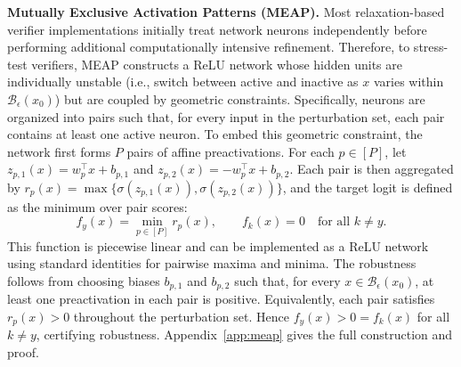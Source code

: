 \documentclass{article}
\theoremstyle{definition}
\begin{document}
\textbf{Mutually Exclusive Activation Patterns (MEAP).} 
Most relaxation-based verifier implementations initially treat network neurons independently before performing additional computationally intensive refinement. 
Therefore, to stress-test verifiers, MEAP constructs a ReLU network whose hidden units are individually unstable (i.e., switch between active and inactive as $x$ varies within $\mathcal{B}_\epsilon(x_0)$) but are coupled by %
geometric constraints. Specifically, neurons are organized into pairs such that, for every input in the perturbation set, each pair contains at least one active neuron. 
To embed this geometric constraint, the network first forms $P$ pairs of affine preactivations. 
For each $p\in[P]$, let $z_{p,1}(x)=w_p^\top x+b_{p,1}$ and $z_{p,2}(x)=-w_p^\top x+b_{p,2}$. 
Each pair is then aggregated by $r_p(x)=\max\{\sigma(z_{p,1}(x)),\sigma(z_{p,2}(x))\}$, and the target logit is defined as the minimum over pair scores: 
\begin{equation}
    f_y(x)
    =
    \min_{p\in[P]} r_p(x),
    \qquad
    f_k(x)=0\quad \text{for all } k\neq y.
    \label{eq:meap_network}
\end{equation}
This function is piecewise linear and can be implemented as a ReLU network using standard identities for pairwise maxima and minima. 
The robustness follows from choosing biases $b_{p,1}$ and $b_{p,2}$ such that, for every $x\in\mathcal{B}_\epsilon(x_0)$, at least one preactivation in each pair is positive. 
Equivalently, each pair satisfies $r_p(x)>0$ throughout the perturbation set. 
Hence $f_y(x)>0=f_k(x)$ for all $k\neq y$, certifying robustness. Appendix~\ref{app:meap} gives the full construction and proof. 
\end{document}
